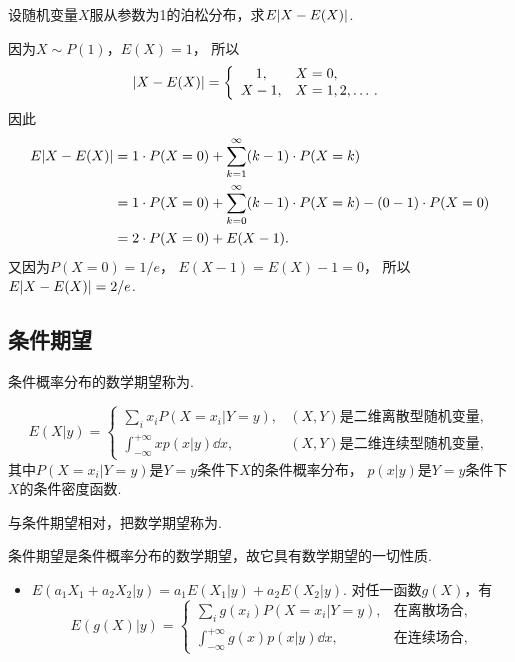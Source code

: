\begin{example}
设随机变量\(X\)服从参数为1的泊松分布，求\(E\abs{X-E(X)}\).
\begin{solution}
因为\(X \sim P(1)\)，\(E(X) = 1\)，
所以\[
	\abs{X-E(X)} = \left\{ \begin{array}{cl}
		1, & X=0, \\
		X - 1, & X=1,2,\dotsc.
	\end{array} \right.
\]
因此\begin{align*}
	E\abs{X-E(X)}
	&= 1 \cdot P(X=0)
	+ \sum_{k=1}^\infty (k-1) \cdot P(X=k) \\
	&= 1 \cdot P(X=0)
	+ \sum_{k=0}^\infty (k-1) \cdot P(X=k)
	- (0-1) \cdot P(X=0) \\
	&= 2 \cdot P(X=0)
	+ E(X-1).
\end{align*}
又因为\(P(X=0)=1/e\)，
\(E(X-1) = E(X) - 1 = 0\)，
所以\(E\abs{X-E(X)} = 2/e\).
\end{solution}
\end{example}

\subsection{条件期望}
\begin{definition}
条件概率分布的数学期望称为.
\end{definition}
\begin{equation}
	E(X \vert y)
	= \left\{ \begin{array}{cl}
		\sum_i x_i P(X=x_i \vert Y = y),
		& \text{$(X,Y)$是二维离散型随机变量}, \\
		\int_{-\infty}^{+\infty} x p(x \vert y) \dd{x},
		& \text{$(X,Y)$是二维连续型随机变量},
	\end{array} \right.
\end{equation}
其中\(P(X=x_i \vert Y=y)\)是\(Y=y\)条件下\(X\)的条件概率分布，
\(p(x \vert y)\)是\(Y=y\)条件下\(X\)的条件密度函数.

与条件期望相对，把数学期望称为.

条件期望是条件概率分布的数学期望，故它具有数学期望的一切性质.
\begin{itemize}
	\item \(E(a_1 X_1 + a_2 X_2 \vert y)
	= a_1 E(X_1 \vert y) + a_2 E(X_2 \vert y)\).
	对任一函数\(g(X)\)，有\[
		E(g(X) \vert y)
		= \left\{ \begin{array}{cl}
			\sum_i g(x_i) P(X=x_i \vert Y = y),
			& \text{在离散场合}, \\
			\int_{-\infty}^{+\infty} g(x) p(x \vert y) \dd{x},
			& \text{在连续场合},
		\end{array} \right.
	\]
\end{itemize}

